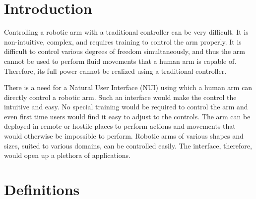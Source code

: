\documentclass[a4paper,11pt]{article}
\begin{document}
\section{Introduction}

Controlling a robotic arm with a traditional controller can be very difficult. It is non-intuitive, complex, and requires training to control the arm properly. It is difficult to control various degrees of freedom simultaneously, and thus the arm cannot be used to perform fluid movements that a human arm is capable of. Therefore, its full power cannot be realized using a traditional controller. 

There is a need for a Natural User Interface (NUI) using which a human arm can directly control a robotic arm. Such an interface would make the control the intuitive and easy. No special training would be required to control the arm and even first time users would find it easy to adjust to the controls. The arm can be deployed in remote or hostile places to perform actions and movements that would otherwise be impossible to perform. Robotic arms of various shapes and sizes, suited to various domains, can be controlled easily. The interface, therefore, would open up a plethora of applications.
\newpage

\section{Definitions}
\end{document}
